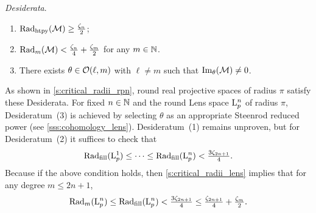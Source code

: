 \medskip\noindent\textit{\darkblue Desiderata}.\
\begin{enumerate}
    \item $\mathrm{Rad}_{\mathrm{htpy}}(\mathcal{M}) \geq \tfrac{\zeta_n}{2} $;
    \item $\mathrm{Rad}_{m}(\mathcal{M}) < \tfrac{\zeta_n}{4}+\tfrac{\zeta_m}{2}$ for any $m \in \mathbb{N}$.
    \item There exists $\theta \in \mathcal{O}(\ell, m)$ with \(\ell \neq m\) such that $\operatorname{Im}_\theta(\mathcal{M}) \neq 0$.
\end{enumerate}

\medskip As shown in \cref{s:critical_radii_rpn}, round real projective spaces of radius \(\pi\) satisfy these Desiderata.
For fixed $n\in \mathbb{N}$ and the round Lens space $\mathrm{L}^n_p$ of radius \(\pi\), Desideratum~(3) is achieved by selecting $\theta$ as an appropriate Steenrod reduced power (see \cref{sss:cohomology_lens}).
Desideratum~(1) remains unproven, but for Desideratum~(2) it suffices to check that
\[
\mathrm{Rad}_{\mathrm{fill}}(\mathrm{L}^1_p) \leq \dotsb \leq \mathrm{Rad}_{\mathrm{fill}}(\mathrm{L}^n_p) < \tfrac{3\zeta_{2n+1}}{4}.
\]
Because if the above condition holds, then \cref{s:critical_radii_lens} implies that for any degree $m \leq 2n+1$,
\[
\mathrm{Rad}_{m}(\mathrm{L}^n_p) \leq \mathrm{Rad}_{\mathrm{fill}}(\mathrm{L}^n_p) < \tfrac{3\zeta_{2n+1}}{4} \leq \tfrac{\zeta_{2n+1}}{4} + \tfrac{\zeta_{m}}{2}.
\]


\subsubsection{}

